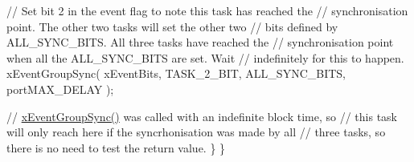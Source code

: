 \begin{DoxyPre}    // Set bit 2 in the event flag to note this task has reached the
    // synchronisation point.  The other two tasks will set the other two
    // bits defined by ALL\_SYNC\_BITS.  All three tasks have reached the
    // synchronisation point when all the ALL\_SYNC\_BITS are set.  Wait
    // indefinitely for this to happen.
    xEventGroupSync( xEventBits, TASK\_2\_BIT, ALL\_SYNC\_BITS, portMAX\_DELAY );\end{DoxyPre}



\begin{DoxyPre}    // \hyperlink{event__groups_8h_a869511456b86426f52e2eec898bff341}{xEventGroupSync()} was called with an indefinite block time, so
    // this task will only reach here if the syncrhonisation was made by all
    // three tasks, so there is no need to test the return value.
   \}
\}\end{DoxyPre}



\begin{DoxyPre}\end{DoxyPre}
 